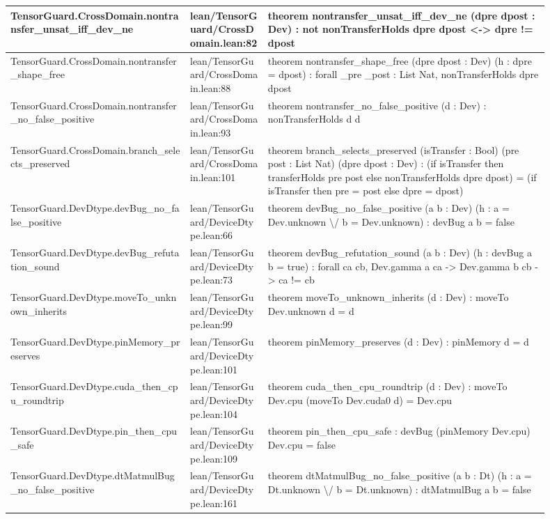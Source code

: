 \documentclass[10pt]{article}
\begin{document}
\begin{longtable}{|p{0.30\linewidth}|p{0.13\linewidth}|p{0.47\linewidth}|}
\hline
TensorGuard.CrossDomain.nontransfer\_unsat\_iff\_dev\_ne & lean/TensorGuard/CrossDomain.lean:82 & theorem nontransfer\_unsat\_iff\_dev\_ne (dpre dpost : Dev) : not  nonTransferHolds dpre dpost <-> dpre != dpost \\
\hline
TensorGuard.CrossDomain.nontransfer\_shape\_free & lean/TensorGuard/CrossDomain.lean:88 & theorem nontransfer\_shape\_free (dpre dpost : Dev) (h : dpre = dpost) : forall \_pre \_post : List Nat, nonTransferHolds dpre dpost \\
\hline
TensorGuard.CrossDomain.nontransfer\_no\_false\_positive & lean/TensorGuard/CrossDomain.lean:93 & theorem nontransfer\_no\_false\_positive (d : Dev) : nonTransferHolds d d \\
\hline
TensorGuard.CrossDomain.branch\_selects\_preserved & lean/TensorGuard/CrossDomain.lean:101 & theorem branch\_selects\_preserved (isTransfer : Bool) (pre post : List Nat) (dpre dpost : Dev) : (if isTransfer then transferHolds pre post else nonTransferHolds dpre dpost) = (if isTransfer then pre = post else dpre = dpost) \\
\hline
TensorGuard.DevDtype.devBug\_no\_false\_positive & lean/TensorGuard/DeviceDtype.lean:66 & theorem devBug\_no\_false\_positive (a b : Dev) (h : a = Dev.unknown \textbackslash{}/ b = Dev.unknown) : devBug a b = false \\
\hline
TensorGuard.DevDtype.devBug\_refutation\_sound & lean/TensorGuard/DeviceDtype.lean:73 & theorem devBug\_refutation\_sound (a b : Dev) (h : devBug a b = true) : forall ca cb, Dev.gamma a ca -> Dev.gamma b cb -> ca != cb \\
\hline
TensorGuard.DevDtype.moveTo\_unknown\_inherits & lean/TensorGuard/DeviceDtype.lean:99 & theorem moveTo\_unknown\_inherits (d : Dev) : moveTo Dev.unknown d = d \\
\hline
TensorGuard.DevDtype.pinMemory\_preserves & lean/TensorGuard/DeviceDtype.lean:101 & theorem pinMemory\_preserves (d : Dev) : pinMemory d = d \\
\hline
TensorGuard.DevDtype.cuda\_then\_cpu\_roundtrip & lean/TensorGuard/DeviceDtype.lean:104 & theorem cuda\_then\_cpu\_roundtrip (d : Dev) : moveTo Dev.cpu (moveTo Dev.cuda0 d) = Dev.cpu \\
\hline
TensorGuard.DevDtype.pin\_then\_cpu\_safe & lean/TensorGuard/DeviceDtype.lean:109 & theorem pin\_then\_cpu\_safe : devBug (pinMemory Dev.cpu) Dev.cpu = false \\
\hline
TensorGuard.DevDtype.dtMatmulBug\_no\_false\_positive & lean/TensorGuard/DeviceDtype.lean:161 & theorem dtMatmulBug\_no\_false\_positive (a b : Dt) (h : a = Dt.unknown \textbackslash{}/ b = Dt.unknown) : dtMatmulBug a b = false \\

\end{longtable}
\end{document}

